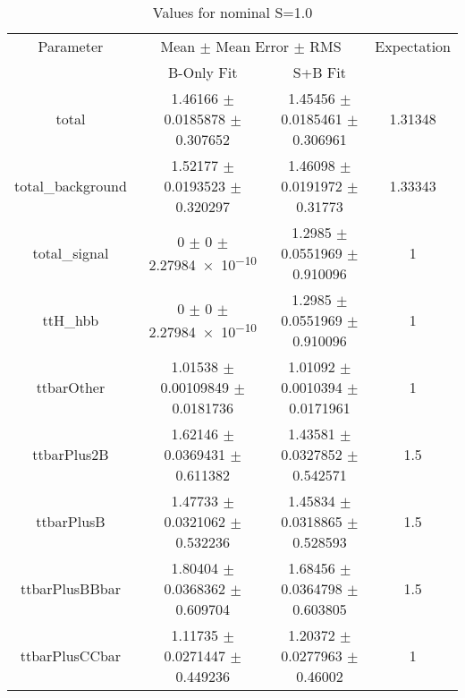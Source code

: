 \begin{table}
\centering
\caption{Values for nominal S=1.0}
\begin{tabular}{cccc}
\toprule
Parameter & \multicolumn{2}{c}{Mean $\pm$ Mean Error $\pm$ RMS} & Expectation\\
 & B-Only Fit & S+B Fit & \\
\midrule
total & \num{1.46166} $\pm$ \num{0.0185878} $\pm$ \num{0.307652} & \num{1.45456} $\pm$ \num{0.0185461} $\pm$ \num{0.306961} & \num{1.31348}\\
total\_background & \num{1.52177} $\pm$ \num{0.0193523} $\pm$ \num{0.320297} & \num{1.46098} $\pm$ \num{0.0191972} $\pm$ \num{0.31773} & \num{1.33343}\\
total\_signal & \num{0} $\pm$ \num{0} $\pm$ \num{2.27984e-10} & \num{1.2985} $\pm$ \num{0.0551969} $\pm$ \num{0.910096} & \num{1}\\
ttH\_hbb & \num{0} $\pm$ \num{0} $\pm$ \num{2.27984e-10} & \num{1.2985} $\pm$ \num{0.0551969} $\pm$ \num{0.910096} & \num{1}\\
ttbarOther & \num{1.01538} $\pm$ \num{0.00109849} $\pm$ \num{0.0181736} & \num{1.01092} $\pm$ \num{0.0010394} $\pm$ \num{0.0171961} & \num{1}\\
ttbarPlus2B & \num{1.62146} $\pm$ \num{0.0369431} $\pm$ \num{0.611382} & \num{1.43581} $\pm$ \num{0.0327852} $\pm$ \num{0.542571} & \num{1.5}\\
ttbarPlusB & \num{1.47733} $\pm$ \num{0.0321062} $\pm$ \num{0.532236} & \num{1.45834} $\pm$ \num{0.0318865} $\pm$ \num{0.528593} & \num{1.5}\\
ttbarPlusBBbar & \num{1.80404} $\pm$ \num{0.0368362} $\pm$ \num{0.609704} & \num{1.68456} $\pm$ \num{0.0364798} $\pm$ \num{0.603805} & \num{1.5}\\
ttbarPlusCCbar & \num{1.11735} $\pm$ \num{0.0271447} $\pm$ \num{0.449236} & \num{1.20372} $\pm$ \num{0.0277963} $\pm$ \num{0.46002} & \num{1}\\
\bottomrule
\end{tabular}
\end{table}